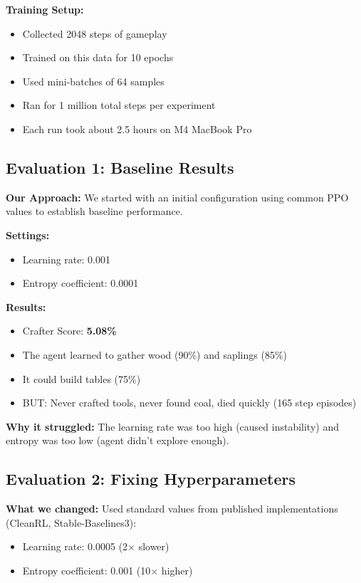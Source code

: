 \documentclass[conference]{IEEEtran}
\begin{document}
\textbf{Training Setup:}
\begin{itemize}
    \item Collected 2048 steps of gameplay
    \item Trained on this data for 10 epochs
    \item Used mini-batches of 64 samples
    \item Ran for 1 million total steps per experiment
    \item Each run took about 2.5 hours on M4 MacBook Pro
\end{itemize}

\subsection{Evaluation 1: Baseline Results}

\textbf{Our Approach:} We started with an initial configuration using common PPO values to establish baseline performance.

\textbf{Settings:}
\begin{itemize}
    \item Learning rate: 0.001
    \item Entropy coefficient: 0.0001
\end{itemize}

\textbf{Results:}
\begin{itemize}
    \item Crafter Score: \textbf{5.08\%}
    \item The agent learned to gather wood (90\%) and saplings (85\%)
    \item It could build tables (75\%)
    \item BUT: Never crafted tools, never found coal, died quickly (165 step episodes)
\end{itemize}

\textbf{Why it struggled:} The learning rate was too high (caused instability) and entropy was too low (agent didn't explore enough).

\subsection{Evaluation 2: Fixing Hyperparameters}

\textbf{What we changed:} Used standard values from published implementations (CleanRL, Stable-Baselines3):
\begin{itemize}
    \item Learning rate: 0.0005 (2× slower)
    \item Entropy coefficient: 0.001 (10× higher)
\end{itemize}
\end{document}
